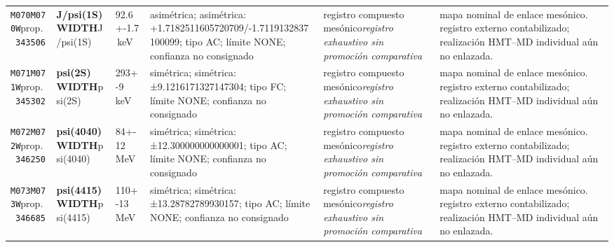 \begin{landscape}
\begin{longtable}{L{1.85cm}L{4.45cm}L{2.35cm}L{4.05cm}L{3.35cm}L{7.15cm}}
\texttt{M070}\newline \texttt{M070W}\newline prop.\ \texttt{343506} & \textbf{J/psi(1S) WIDTH}\newline J/psi(1S) & 92.6+-1.7\,keV & asimétrica; asimétrica: +1.7182511605720709/-1.7119132837100099; tipo AC; límite NONE; confianza no consignado & registro compuesto mesónico\newline \emph{registro exhaustivo sin promoción comparativa} & mapa nominal de enlace mesónico. registro externo contabilizado; realización HMT--MD individual aún no enlazada. \\
\texttt{M071}\newline \texttt{M071W}\newline prop.\ \texttt{345302} & \textbf{psi(2S) WIDTH}\newline psi(2S) & 293+-9\,keV & simétrica; simétrica: ±9.1216171327147304; tipo FC; límite NONE; confianza no consignado & registro compuesto mesónico\newline \emph{registro exhaustivo sin promoción comparativa} & mapa nominal de enlace mesónico. registro externo contabilizado; realización HMT--MD individual aún no enlazada. \\
\texttt{M072}\newline \texttt{M072W}\newline prop.\ \texttt{346250} & \textbf{psi(4040) WIDTH}\newline psi(4040) & 84+-12\,MeV & simétrica; simétrica: ±12.300000000000001; tipo AC; límite NONE; confianza no consignado & registro compuesto mesónico\newline \emph{registro exhaustivo sin promoción comparativa} & mapa nominal de enlace mesónico. registro externo contabilizado; realización HMT--MD individual aún no enlazada. \\
\texttt{M073}\newline \texttt{M073W}\newline prop.\ \texttt{346685} & \textbf{psi(4415) WIDTH}\newline psi(4415) & 110+-13\,MeV & simétrica; simétrica: ±13.28782789930157; tipo AC; límite NONE; confianza no consignado & registro compuesto mesónico\newline \emph{registro exhaustivo sin promoción comparativa} & mapa nominal de enlace mesónico. registro externo contabilizado; realización HMT--MD individual aún no enlazada. \\

\end{longtable}
\end{landscape}

